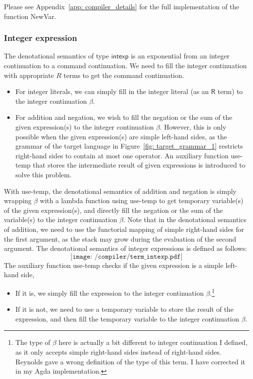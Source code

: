 \documentclass[12pt,a4paper]{report}
\theoremstyle{definition}
\begin{document}
        Please see Appendix~\ref{app: compiler_details} for the full implementation of the function \textsf{NewVar}.

        \subsubsection{Integer expression} \label{subsubsec: compiler_intexp}
        The denotational semantics of type $\mathsf{intexp}$ is an exponential from an integer continuation to a command continuation. We need to fill the integer continuation with appropriate $R$ terms to get the command continuation. 
        \begin{itemize}
            \item For integer literals, we can simply fill in the integer literal (as an $\mathsf{R}$ term) to the integer continuation $\beta$.
            \item For addition and negation, we wish to fill the negation or the sum of the given expression(s) to the integer continuation $\beta$. However, this is only possible when the given expression(s) are simple left-hand sides, as the grammar of the target language in Figure~\ref{fig: target_grammar_1} restricts right-hand sides to contain at most one operator. An auxiliary function \textsf{use-temp} that stores the intermediate result of given expressions is introduced to solve this problem. 
        \end{itemize}
        With \textsf{use-temp}, the denotational semantics of addition and negation is simply wrapping $\beta$ with a lambda function using \textsf{use-temp} to get temporary variable(s) of the given expression(s), and directly fill the negation or the sum of the variable(s) to the integer continuation $\beta$. Note that in the denotational semantics of addition, we need to use the functorial mapping of simple right-hand sides for the first argument, as the stack may grow during the evaluation of the second argument. The denotational semantics of integer expressions is defined as follows:
        \[\texttt{[image: /compiler/term\_intexp.pdf]}\]
        The auxiliary function \textsf{use-temp} checks if the given expression is a simple left-hand side,
        \begin{itemize}
            \item If it is, we simply fill the expression to the integer continuation $\beta$.\footnote{The type of $\beta$ here is actually a bit different to integer continuation I defined, as it only accepts simple right-hand sides instead of right-hand sides. Reynolds gave a wrong definition of the type of this term. I have corrected it in my Agda implementation.}
            \item If it is not, we need to use a temporary variable to store the result of the expression, and then fill the temporary variable to the integer continuation $\beta$.
        \end{itemize}
\end{document}
